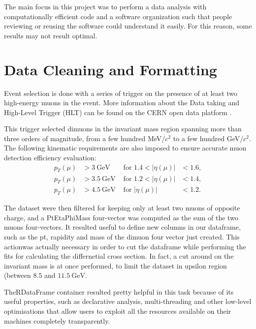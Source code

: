 \documentclass[a4paper,11pt]{article}
\begin{document}
The main focus in this project was to perform a data analysis with computationally efficient code and a software organization such that people reviewing or reusing the software could understand it easily. For this reason, some results may not result optimal.

\section{Data Cleaning and Formatting}
Event selection is done with a series of trigger on the presence of at least two high-energy muons in the event. More information about the Data taking and High-Level Trigger (HLT) can be found on the CERN open data platform \cite{dataB}\cite{dataC}.

This trigger selected dimuons in the invariant mass region spanning more than three orders of magnitude, from a few hundred MeV/$c^2$ to a few hundred GeV/$c^2$.
The following kinematic requirements are also imposed to ensure accurate muon detection efficiency evaluation:
\begin{align}\label{kine}
p_T(\mu) &> \SI{3}{\giga\eV} &   \text{ for } 1.4 < |\eta(\mu)|&< 1.6,\\\nonumber
p_T(\mu) &> \SI{3.5}{\giga\eV} &  \text{ for } 1.2< |\eta(\mu)|&<1.4,\\\nonumber
p_T(\mu) &> \SI{4.5}{\giga\eV} & \text{ for } |\eta(\mu)|&< 1.2.
\end{align}

The dataset were then filtered for keeping only at least two muons of opposite charge, and a PtEtaPhiMass four-vector was computed as the sum of the two muons four-vectors. 
It resulted useful to define new columns in our dataframe, such as the pt, rapidity and mass of the dimuon four vector just created. This actionwas actually necessary in order to cut the dataframe while performing the fits for calculating the differnetial cross section. In fact, a cut around on the invariant mass is at once performed, to limit the dataset in upsilon region (between $8.5$ and $\SI{11.5}{\giga\eV}$.

 TheRDataFrame container resulted pretty helpful in this task because of its useful properties, such as declarative analysis, multi-threading and other low-level optimisations that allow users to exploit all the resources available on their machines completely transparently.
 
\end{document}
